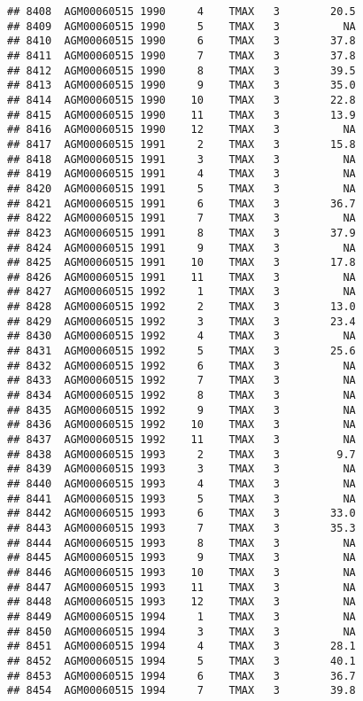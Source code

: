\documentclass{article}\usepackage[]{graphicx}\usepackage[]{color}
\makeatletter
\newenvironment{kframe}{%
 \def\at@end@of@kframe{}%
 \ifinner\ifhmode%
  \def\at@end@of@kframe{\end{minipage}}%
  \begin{minipage}{\columnwidth}%
 \fi\fi%
 \def\FrameCommand##1{\hskip\@totalleftmargin \hskip-\fboxsep
 \colorbox{shadecolor}{##1}\hskip-\fboxsep
     \hskip-\linewidth \hskip-\@totalleftmargin \hskip\columnwidth}%
 \MakeFramed {\advance\hsize-\width
   \@totalleftmargin\z@ \linewidth\hsize
   \@setminipage}}%
 {\par\unskip\endMakeFramed%
 \at@end@of@kframe}
\newenvironment{knitrout}{}{} %
\makeatother
\begin{document}
\begin{knitrout}
\begin{kframe}
\begin{verbatim}
## 8408  AGM00060515 1990     4    TMAX   3        20.5
## 8409  AGM00060515 1990     5    TMAX   3          NA
## 8410  AGM00060515 1990     6    TMAX   3        37.8
## 8411  AGM00060515 1990     7    TMAX   3        37.8
## 8412  AGM00060515 1990     8    TMAX   3        39.5
## 8413  AGM00060515 1990     9    TMAX   3        35.0
## 8414  AGM00060515 1990    10    TMAX   3        22.8
## 8415  AGM00060515 1990    11    TMAX   3        13.9
## 8416  AGM00060515 1990    12    TMAX   3          NA
## 8417  AGM00060515 1991     2    TMAX   3        15.8
## 8418  AGM00060515 1991     3    TMAX   3          NA
## 8419  AGM00060515 1991     4    TMAX   3          NA
## 8420  AGM00060515 1991     5    TMAX   3          NA
## 8421  AGM00060515 1991     6    TMAX   3        36.7
## 8422  AGM00060515 1991     7    TMAX   3          NA
## 8423  AGM00060515 1991     8    TMAX   3        37.9
## 8424  AGM00060515 1991     9    TMAX   3          NA
## 8425  AGM00060515 1991    10    TMAX   3        17.8
## 8426  AGM00060515 1991    11    TMAX   3          NA
## 8427  AGM00060515 1992     1    TMAX   3          NA
## 8428  AGM00060515 1992     2    TMAX   3        13.0
## 8429  AGM00060515 1992     3    TMAX   3        23.4
## 8430  AGM00060515 1992     4    TMAX   3          NA
## 8431  AGM00060515 1992     5    TMAX   3        25.6
## 8432  AGM00060515 1992     6    TMAX   3          NA
## 8433  AGM00060515 1992     7    TMAX   3          NA
## 8434  AGM00060515 1992     8    TMAX   3          NA
## 8435  AGM00060515 1992     9    TMAX   3          NA
## 8436  AGM00060515 1992    10    TMAX   3          NA
## 8437  AGM00060515 1992    11    TMAX   3          NA
## 8438  AGM00060515 1993     2    TMAX   3         9.7
## 8439  AGM00060515 1993     3    TMAX   3          NA
## 8440  AGM00060515 1993     4    TMAX   3          NA
## 8441  AGM00060515 1993     5    TMAX   3          NA
## 8442  AGM00060515 1993     6    TMAX   3        33.0
## 8443  AGM00060515 1993     7    TMAX   3        35.3
## 8444  AGM00060515 1993     8    TMAX   3          NA
## 8445  AGM00060515 1993     9    TMAX   3          NA
## 8446  AGM00060515 1993    10    TMAX   3          NA
## 8447  AGM00060515 1993    11    TMAX   3          NA
## 8448  AGM00060515 1993    12    TMAX   3          NA
## 8449  AGM00060515 1994     1    TMAX   3          NA
## 8450  AGM00060515 1994     3    TMAX   3          NA
## 8451  AGM00060515 1994     4    TMAX   3        28.1
## 8452  AGM00060515 1994     5    TMAX   3        40.1
## 8453  AGM00060515 1994     6    TMAX   3        36.7
## 8454  AGM00060515 1994     7    TMAX   3        39.8

\end{verbatim}
\end{kframe}
\end{knitrout}
\end{document}
